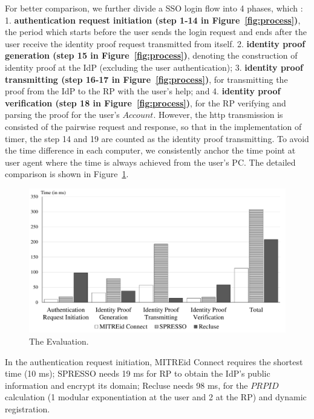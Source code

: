 For better comparison, we further divide a SSO login flow into 4 phases, which : 1. \textbf{authentication request initiation (step 1-14 in Figure~\ref{fig:process})}, the period which starts before the user sends the login request and ends after the user receive the identity proof request transmitted from itself. 
2. \textbf{identity proof generation (step 15 in Figure~\ref{fig:process})}, denoting the construction of identity proof at the IdP (excluding the user authentication); 3. \textbf{identity proof transmitting (step 16-17 in Figure~\ref{fig:process})}, for transmitting the proof from the IdP to the RP with the user's help; and 4. \textbf{identity proof verification (step 18 in Figure~\ref{fig:process})}, for the RP  verifying and parsing the proof for the user's $Account$. However, the http transmission is consisted of the pairwise request and response, so that in the implementation of timer, the step 14 and 19 are counted as the identity proof transmitting. To avoid the time difference in each computer, we consistently anchor the time point at user agent where the time is always achieved from the user's PC. The detailed comparison is shown in Figure~\ref{fig:evaluation}.



\begin{figure}
  \centering
  \includegraphics[width=\linewidth]{fig/evaluation2.pdf}
  \caption{The Evaluation.}
  \label{fig:evaluation}
\end{figure}
In the authentication request initiation, MITREid Connect requires the shortest time (10 ms); SPRESSO needs 19 ms for RP to obtain the IdP's public information and encrypt its domain; Recluse needs 98 ms, for the $PRPID$ calculation (1 modular exponentiation at the user and 2 at the RP) and dynamic registration.

